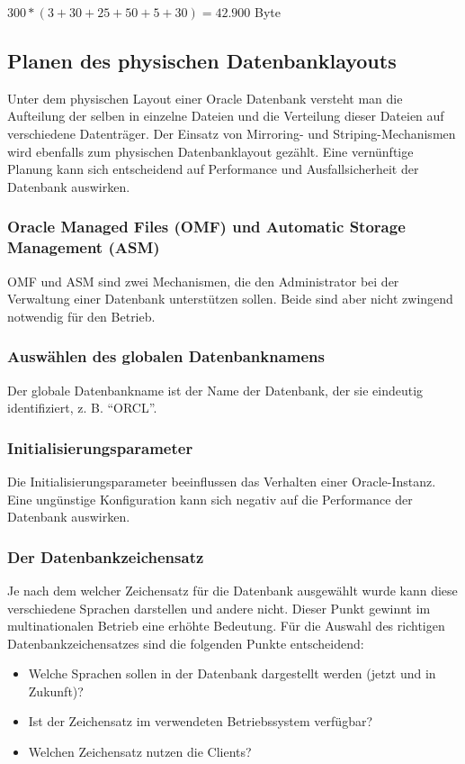           \centerline{$300*(3+30+25+50+5+30)=42.900$ Byte}

      \subsection{Planen des physischen Datenbanklayouts}
        Unter dem physischen Layout einer Oracle Datenbank versteht man die Aufteilung der selben in einzelne Dateien und die Verteilung dieser Dateien auf verschiedene Datenträger. Der Einsatz von Mirroring- und Striping-Mechanismen wird ebenfalls zum physischen Datenbanklayout gezählt. Eine vernünftige Planung kann sich entscheidend auf Performance und Ausfallsicherheit der Datenbank auswirken.
        \subsubsection{Oracle Managed Files (OMF) und Automatic Storage Management (ASM)}
          OMF und ASM sind zwei Mechanismen, die den Administrator bei der Verwaltung einer Datenbank unterstützen sollen. Beide sind aber nicht zwingend notwendig für den Betrieb.
        \subsubsection{Auswählen des globalen Datenbanknamens}
          Der globale Datenbankname ist der Name der Datenbank, der sie eindeutig identifiziert, z. B. \enquote{ORCL}.
        \subsubsection{Initialisierungsparameter}
          Die Initialisierungsparameter beeinflussen das Verhalten einer Oracle-Instanz. Eine ungünstige Konfiguration kann sich negativ auf die Performance der Datenbank auswirken.
        \subsubsection{Der Datenbankzeichensatz}
          Je nach dem welcher Zeichensatz für die Datenbank ausgewählt wurde kann diese verschiedene Sprachen darstellen und andere nicht. Dieser Punkt gewinnt im multinationalen Betrieb eine erhöhte Bedeutung. Für die Auswahl des richtigen Datenbankzeichensatzes sind die folgenden Punkte entscheidend:
          \begin{itemize}
            \item Welche Sprachen sollen in der Datenbank dargestellt werden (jetzt und in Zukunft)?
            \item Ist der Zeichensatz im verwendeten Betriebssystem verfügbar?
            \item Welchen Zeichensatz nutzen die Clients?
          \end{itemize}

